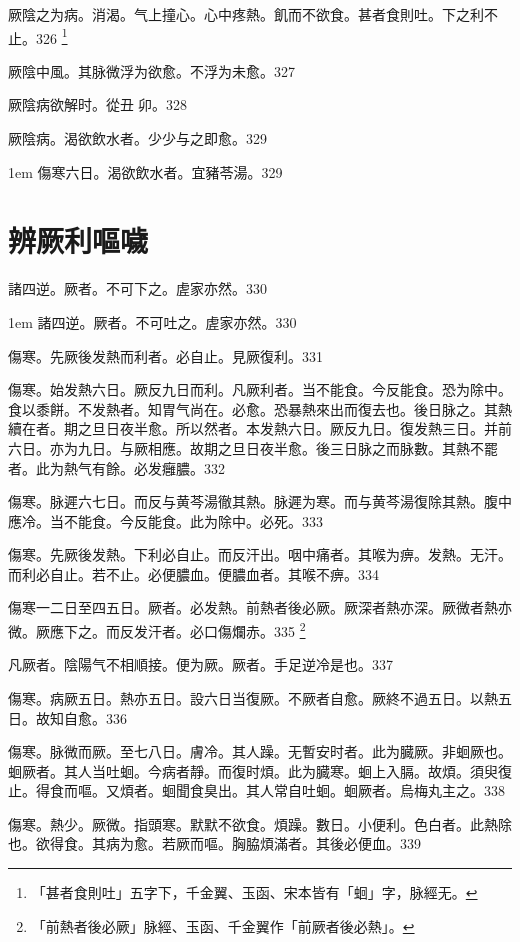 厥陰之为病。消渴。气上撞{\khaaitp 心}。心中疼熱。飢而不欲食。{\khaaitp 甚者}食則吐。下之利不止。326
	\footnote{「甚者食則吐」五字下，千金翼、玉函、宋本皆有「蛔」字，脉經无。}

厥陰中風。其脉微浮为欲愈。不浮为未愈。327

厥陰病欲解时。從丑{\sungtpii 𥁞}卯。328

厥陰病。渴欲飲水者。少少与之即愈。329

\hangindent 1em
傷寒六日。渴欲飲水者。宜豬苓湯。{\gaoben}329

\chapter{辨厥利嘔噦}

諸四逆。厥者。不可下之。虗家亦然。330

\hangindent 1em
諸四逆。厥者。不可吐之。虗家亦然。330

傷寒。先厥後发熱而利者。必自止。見厥復利。331

傷寒。始发熱六日。厥反九日而利。凡厥利者。当不能食。今反能食。恐为除中。食以黍餅。不发熱者。知胃气尚在。必愈。恐暴熱來出而復去也。後日脉之。其熱續在者。期之旦日夜半愈。所以然者。本发熱六日。厥反九日。復发熱三日。并前六日。亦为九日。与厥相應。故期之旦日夜半愈。後三日脉之而脉數。其熱不罷者。此为熱气有餘。必发癰膿。332

傷寒。脉遲六七日。而反与黄芩湯徹其熱。脉遲为寒。而与黄芩湯復除其熱。腹中應冷。当不能食。今反能食。此为除中。必死。333

傷寒。先厥後发熱。下利必自止。而反汗出。咽中痛者。其喉为痹。发熱。无汗。而利必自止。若不止。必便膿血。便膿血者。其喉不痹。334

傷寒一二日至四五日。厥者。必发熱。前熱者後必厥。厥深者熱亦深。厥微者熱亦微。厥應下之。而反发汗者。必口傷爛赤。335
	\footnote{「前熱者後必厥」脉經、玉函、千金翼作「前厥者後必熱」。}

凡厥者。陰陽气不相順接。便为厥。厥者。手足逆冷是也。337

傷寒。病厥五日。熱亦五日。設六日当復厥。不厥者自愈。厥終不過五日。以熱五日。故知自愈。336

傷寒。脉微而厥。至七八日。膚冷。其人躁。无暫安时者。此为臓厥。非蛔厥也。蛔厥者。其人当吐蛔。今病者靜。而復时煩。此为臓寒。蛔上入膈。故煩。須臾復止。得食而嘔。又煩者。蛔聞食臭出。其人常自吐蛔。蛔厥者。烏梅丸主之。338

傷寒。熱少。厥微。指頭寒。默默不欲食。煩躁。數日。小便利。色白者。此熱除也。欲得食。其病为愈。若厥而嘔。胸脇煩滿者。其後必便血。339

